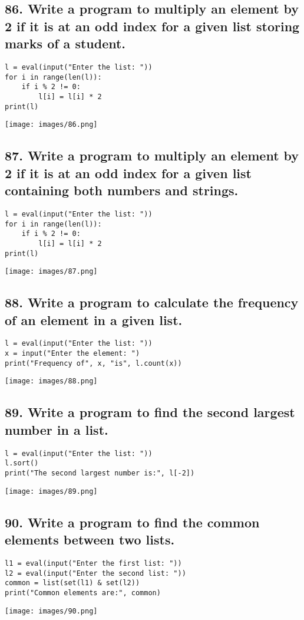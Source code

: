 \documentclass[12pt]{article}
\begin{document}
\subsection*{86. Write a program to multiply an element by 2 if it is at an odd index for a given list storing marks of a student.}
\begin{verbatim}
l = eval(input("Enter the list: "))
for i in range(len(l)):
    if i % 2 != 0:
        l[i] = l[i] * 2
print(l)
\end{verbatim}
\texttt{[image: images/86.png]}

\subsection*{87. Write a program to multiply an element by 2 if it is at an odd index for a given list containing both numbers and strings.}
\begin{verbatim}
l = eval(input("Enter the list: "))
for i in range(len(l)):
    if i % 2 != 0:
        l[i] = l[i] * 2
print(l)
\end{verbatim}
\texttt{[image: images/87.png]}

\subsection*{88. Write a program to calculate the frequency of an element in a given list.}
\begin{verbatim}
l = eval(input("Enter the list: "))
x = input("Enter the element: ")
print("Frequency of", x, "is", l.count(x))
\end{verbatim}
\texttt{[image: images/88.png]}
\subsection*{89. Write a program to find the second largest number in a list.}
\begin{verbatim}
l = eval(input("Enter the list: "))
l.sort()
print("The second largest number is:", l[-2])
\end{verbatim}
\texttt{[image: images/89.png]}

\subsection*{90. Write a program to find the common elements between two lists.}
\begin{verbatim}
l1 = eval(input("Enter the first list: "))
l2 = eval(input("Enter the second list: "))
common = list(set(l1) & set(l2))
print("Common elements are:", common)
\end{verbatim}
\texttt{[image: images/90.png]}
\end{document}
